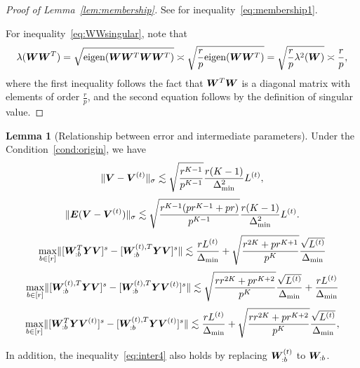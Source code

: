 \documentclass[lettersize,onecolumn,journal]{IEEEtran}
\theoremstyle{definition}
\newtheorem{lem}{Lemma}
\theoremstyle{definition}
\begin{document}
\begin{proof}[Proof of Lemma~\ref{lem:membership}] See \citet[Proof of Lemma 4]{han2020exact} for inequality~\eqref{eq:membership1}.

For inequality~\eqref{eq:WWsingular}, note that 
\begin{align}
    \lambda(\bm{W}\bm{W}^T) = \sqrt{\text{eigen} (\bm{W} \bm{W}^T\bm{W}\bm{W}^T)} \asymp \sqrt{\frac{r}{p} \text{eigen} (\bm{W} \bm{W}^T)} = \sqrt{\frac{r}{p} \lambda^2(\bm{W})} \asymp \frac{r}{p},
\end{align}
where the first inequality follows the fact that $\bm{W}^T\bm{W}$ is a diagonal matrix with elements of order $\frac{r}{p}$, and the second equation follows by the definition of singular value.
\end{proof}


     \begin{lem}[Relationship between error and intermediate parameters]\label{lem:intermediate} Under the Condition~\ref{cond:origin}, we have
    \begin{equation}\label{eq:inter1}
        \onormSize{}{\mV - \mV^{(t)}}_{\sigma} \lesssim \sqrt{\frac{r^{K-1}}{p^{K-1}}}  \frac{r(K-1)}{\Delta_{\min}^2} L^{(t)},
    \end{equation}
    \begin{equation}\label{eq:inter2}
        \onormSize{}{\mE (\mV - \mV^{(t)})}_{\sigma} \lesssim \sqrt{ \frac{r^{K-1}(p r^{K-1} + p r)}{p^{K-1}}} 
 \frac{r(K-1)}{\Delta_{\min}^2} L^{(t)}.    
 \end{equation}
 \begin{equation}\label{eq:inter3}
     \max_{b \in [r]} \onormSize{}{ [ \mW_{:b}^T \mY \mV ]^s   -  [ \mW_{:b}^{(t), T} \mY \mV  ]^s } \lesssim \frac{r L^{(t)}}{\Delta_{\min}} + \sqrt{ \frac{r^{2K} + pr^{K+1}}{p^{K}} } \frac{\sqrt{L^{(t)}}}{\Delta_{\min}}
 \end{equation}
 \begin{equation}\label{eq:inter4}
     \max_{b \in [r]} \onormSize{}{  [  \mW_{:b}^{(t), T}  \mY \mV]^s - [  \mW_{:b}^{(t), T}  \mY \mV^{(t)}]^s } \lesssim  \sqrt{ \frac{rr^{2K} + p r^{K+2}}{p^{K}}}  \frac{\sqrt{L^{(t)}}}{\Delta_{\min}} +  \frac{r L^{(t)}}{\Delta_{\min}}
     \end{equation}
    \begin{equation}\label{eq:inter5}
         \max_{b \in [r]} \onormSize{}{ [\mW_{:b}^T \mY \mV^{(t)} ]^s   -  [ \mW_{:b}^{(t), T} \mY \mV^{(t)} ]^s } \lesssim \frac{rL^{(t)}}{\Delta_{\min}} + \sqrt{ \frac{rr^{2K} + p r^{K+2}}{p^{K}}}  \frac{\sqrt{L^{(t)}}}{\Delta_{\min}},
    \end{equation}
    
    In addition, the inequality~\eqref{eq:inter4} also holds by replacing $\bm{W}_{:b}^{(t)}$ to $\bm{W}_{:b}$.
    \end{lem}
        
\end{document}
